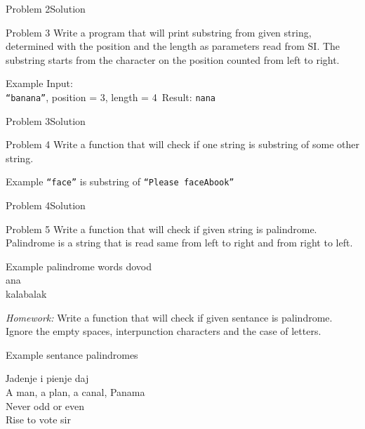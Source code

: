 \begin{frame}[fragile]{Problem 2}{Solution} 

\end{frame}

\begin{frame}{Problem 3}
Write a program that will print substring from given string, determined with the
position and the length as parameters read from SI. The substring starts from
the character on the position counted from left to right.
\begin{exampleblock}{Example}
Input:\\
\texttt{``banana''}, position = 3, length = 4\
Result: \texttt{nana}
\end{exampleblock}    
\end{frame}

\begin{frame}[fragile]{Problem 3}{Solution}

\end{frame}

\begin{frame}{Problem 4}
Write a function that will check if one string is substring of some other
string.
\begin{exampleblock}{Example}
\texttt{``face''} is substring of \texttt{``Please faceAbook''}
\end{exampleblock}  
\end{frame}

\begin{frame}[fragile]{Problem 4}{Solution}

\end{frame}

\begin{frame}{Problem 5}
Write a function that will check if given string is palindrome. Palindrome is a
string that is read same from left to right and from right to left.
\begin{exampleblock}{Example palindrome words}
dovod\\
ana\\
kalabalak
\end{exampleblock}
\begin{scriptsize}
\emph{Homework:} Write a function that will check if given sentance is
palindrome. Ignore the empty spaces, interpunction characters and the case of
letters.
\end{scriptsize}
\begin{exampleblock}{Example sentance palindromes}
\begin{scriptsize}
Јadenje i pienje daj\\
A man, a plan, a canal, Panama\\
Never odd or even\\
Rise to vote sir
\end{scriptsize}
\end{exampleblock}

\end{frame}

